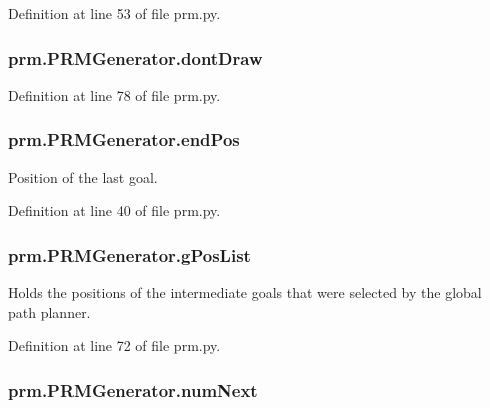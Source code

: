 Definition at line 53 of file prm.\-py.

\hypertarget{classprm_1_1PRMGenerator_a6a92750aa0e081cc87c64e157b0ecb53}{
\subsubsection[{dont\-Draw}]{\setlength{\rightskip}{0pt plus 5cm}prm.\-P\-R\-M\-Generator.\-dont\-Draw}}\label{classprm_1_1PRMGenerator_a6a92750aa0e081cc87c64e157b0ecb53}


Definition at line 78 of file prm.\-py.

\hypertarget{classprm_1_1PRMGenerator_a8925b6d51130804d23bb82d3b8602d74}{
\subsubsection[{end\-Pos}]{\setlength{\rightskip}{0pt plus 5cm}prm.\-P\-R\-M\-Generator.\-end\-Pos}}\label{classprm_1_1PRMGenerator_a8925b6d51130804d23bb82d3b8602d74}


Position of the last goal. 



Definition at line 40 of file prm.\-py.

\hypertarget{classprm_1_1PRMGenerator_a164c6ae962a75ed31d58eff1db95f141}{
\subsubsection[{g\-Pos\-List}]{\setlength{\rightskip}{0pt plus 5cm}prm.\-P\-R\-M\-Generator.\-g\-Pos\-List}}\label{classprm_1_1PRMGenerator_a164c6ae962a75ed31d58eff1db95f141}


Holds the positions of the intermediate goals that were selected by the global path planner. 



Definition at line 72 of file prm.\-py.

\hypertarget{classprm_1_1PRMGenerator_a84795d8a1191caae0612ac645d8853b9}{
\subsubsection[{num\-Next}]{\setlength{\rightskip}{0pt plus 5cm}prm.\-P\-R\-M\-Generator.\-num\-Next}}\label{classprm_1_1PRMGenerator_a84795d8a1191caae0612ac645d8853b9}


